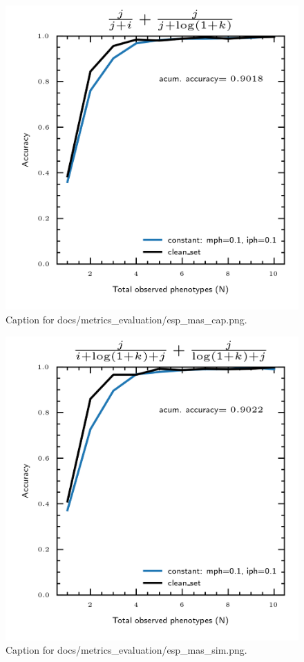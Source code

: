 \documentclass{article}
\begin{document}
\begin{figure}[h] \centering \includegraphics{docs/metrics_evaluation/esp_mas_cap.png} \caption{Caption for docs/metrics_evaluation/esp_mas_cap.png.} \end{figure}
\begin{figure}[h] \centering \includegraphics{docs/metrics_evaluation/esp_mas_sim.png} \caption{Caption for docs/metrics_evaluation/esp_mas_sim.png.} \end{figure}
\end{document}
